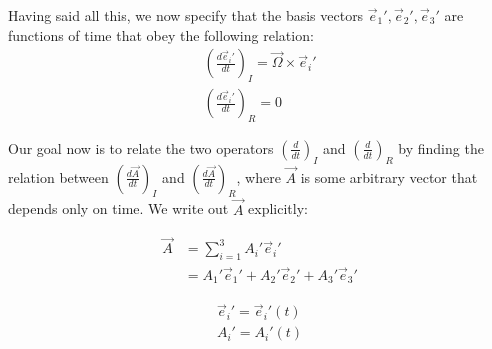 Having said all this, we now specify that the basis vectors \(\vec{e}_1', \vec{e}_2', \vec{e}_3'\) are functions of time that obey the following relation:
\begin{gather}
    \label{eq Rotating Basis Vector}
    \left( \frac{d \vec{e}_i'}{d t} \right)_{I}=\vec{\Omega}\times\vec{e}_i'
    \\
    \left( \frac{d \vec{e}_i'}{d t} \right)_{R}=0
    \nonumber
\end{gather}

Our goal now is to relate the two operators \(\left(\frac{d}{d t}\right)_{I}\) and \(\left(\frac{d}{d t}\right)_{R}\) by finding the relation between \(\left(\frac{d\vec{A}}{d t}\right)_{I}\) and \(\left(\frac{d\vec{A}}{d t}\right)_{R}\), where \(\vec{A}\) is some arbitrary vector that depends only on time. We write out \(\vec{A}\) explicitly:

\vspace{-4mm}
\begin{minipage}{.5\linewidth}
\begin{align*}
    \vec{A}&=\sum_{i=1}^{3}A_i'\vec{e}_i'
    \\
    &=
    A_1'\vec{e}_1'
    +A_2'\vec{e}_2'
    +A_3'\vec{e}_3'
\end{align*}
\end{minipage}
\begin{minipage}{.5\linewidth}
\begin{gather*}
    \vec{e}_i'=\vec{e}_i'(t)
    \\
    A_i'=A_i'(t)
\end{gather*}
\end{minipage}


